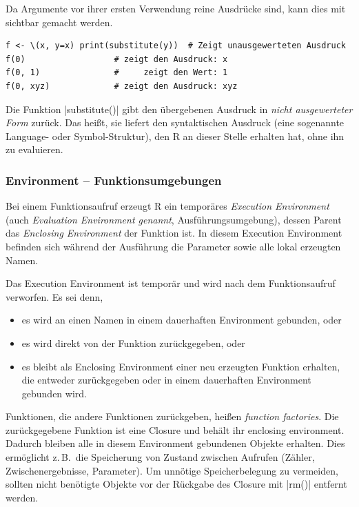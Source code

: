 \documentclass[10pt,twocolumn]{scrartcl}
\renewcommand{\lstinline}{\mycoloredinline}
\begin{document}
Da Argumente vor ihrer ersten Verwendung reine Ausdrücke sind, kann dies mit
\lstinline{substitute()} sichtbar gemacht werden.

\begin{lstlisting}
f <- \(x, y=x) print(substitute(y))  # Zeigt unausgewerteten Ausdruck
f(0)                  # zeigt den Ausdruck: x
f(0, 1)               #     zeigt den Wert: 1
f(0, xyz)             # zeigt den Ausdruck: xyz
\end{lstlisting}

Die Funktion \lstinline|substitute()| gibt den übergebenen Ausdruck in
\emph{nicht ausgewerteter Form} zurück. Das heißt, sie liefert den
syntaktischen Ausdruck (eine sogenannte Language- oder Symbol-Struktur),
den R an dieser Stelle erhalten hat, ohne ihn zu evaluieren.


\subsubsection{Environment -- Funktionsumgebungen}

Bei einem Funktionsaufruf erzeugt R ein temporäres \emph{Execution Environment} (auch \emph{Evaluation Environment genannt},  Ausführungsumgebung), dessen Parent das \emph{Enclosing Environment} der Funktion ist. In diesem Execution Environment befinden sich während der Ausführung die Parameter sowie alle lokal erzeugten Namen.

Das Execution Environment ist temporär und wird nach dem Funktionsaufruf verworfen. Es sei denn,
\begin{itemize}
\item es wird an einen Namen in einem dauerhaften Environment gebunden, oder
\item es wird direkt von der Funktion zurückgegeben, oder
\item es bleibt als Enclosing Environment einer neu erzeugten Funktion erhalten, die entweder zurückgegeben oder in einem dauerhaften Environment gebunden wird.
\end{itemize}

Funktionen, die andere Funktionen zurückgeben, heißen \emph{function factories}.
Die zurückgegebene Funktion ist eine Closure und behält ihr enclosing environment.
Dadurch bleiben alle in diesem Environment gebundenen Objekte erhalten.
Dies ermöglicht z.\,B.\ die Speicherung von Zustand zwischen Aufrufen (Zähler, Zwischenergebnisse, Parameter).
Um unnötige Speicherbelegung zu vermeiden, sollten nicht benötigte Objekte vor der Rückgabe des Closure mit \lstinline|rm()| entfernt werden.
\end{document}
